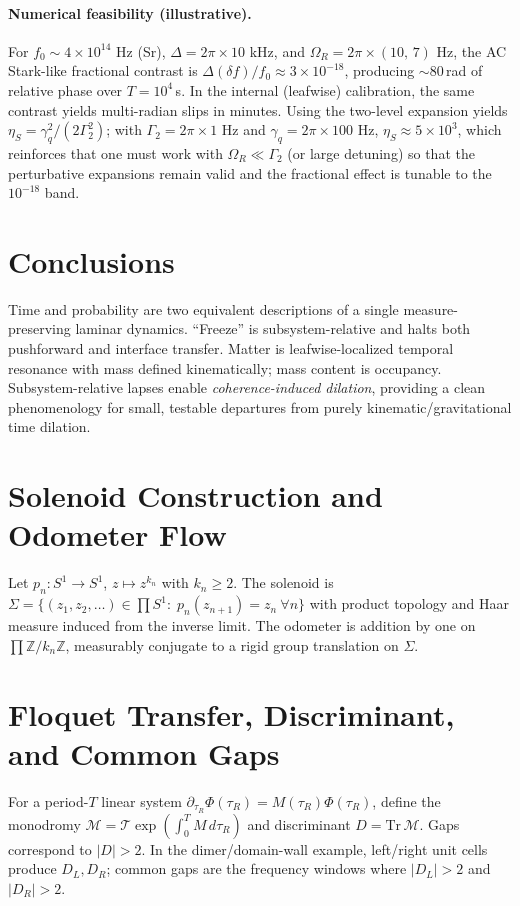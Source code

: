 \documentclass[11pt]{article}
\newcommand{\Z}{\mathbb{Z}}
\begin{document}
\paragraph{Numerical feasibility (illustrative).}
For $f_0\sim 4\times 10^{14}$ Hz (Sr), $\Delta=2\pi\times 10$ kHz, and $\Omega_R=2\pi\times (10,\,7)$ Hz, the AC Stark-like fractional contrast is 
$\Delta(\delta f)/f_0 \approx 3\times 10^{-18}$, producing $\sim 80$\,rad of relative phase over $T=10^4$\,s. 
In the internal (leafwise) calibration, the same contrast yields multi-radian slips in minutes. 
Using the two-level expansion yields $\eta_S=\gamma_q^2/(2\Gamma_2^2)$; with $\Gamma_2=2\pi\times 1$ Hz and $\gamma_q=2\pi\times 100$ Hz, $\eta_S\approx 5\times 10^3$, which reinforces that one must work with $\Omega_R\ll\Gamma_2$ (or large detuning) so that the perturbative expansions remain valid and the fractional effect is tunable to the $10^{-18}$ band.


\section{Conclusions}
Time and probability are two equivalent descriptions of a single measure-preserving laminar dynamics. ``Freeze'' is subsystem-relative and halts both pushforward and interface transfer. Matter is leafwise-localized temporal resonance with mass defined kinematically; mass content is occupancy. Subsystem-relative lapses enable \emph{coherence-induced dilation}, providing a clean phenomenology for small, testable departures from purely kinematic/gravitational time dilation.

\appendix

\section{Solenoid Construction and Odometer Flow}
\label{app:solenoid}
Let \(p_n:S^1\to S^1\), \(z\mapsto z^{k_n}\) with \(k_n\ge 2\).
The solenoid is \(\Sigma=\{(z_1,z_2,\dots)\in \prod S^1:\; p_n(z_{n+1})=z_n\ \forall n\}\) with product topology and Haar measure induced from the inverse limit. 
The odometer is addition by one on \(\prod \Z/k_n\Z\), measurably conjugate to a rigid group translation on \(\Sigma\).

\section{Floquet Transfer, Discriminant, and Common Gaps}
\label{app:floquet}
For a period-\(T\) linear system \(\partial_{\tau_R} \Phi(\tau_R)=M(\tau_R)\Phi(\tau_R)\), define the monodromy \(\mathcal M=\mathcal T\exp(\int_0^T M\,d\tau_R)\) and discriminant \(D=\mathrm{Tr}\,\mathcal M\).
Gaps correspond to \(|D|>2\). In the dimer/domain-wall example, left/right unit cells produce \(D_L,D_R\); common gaps are the frequency windows where \(|D_L|>2\) and \(|D_R|>2\).
\end{document}

